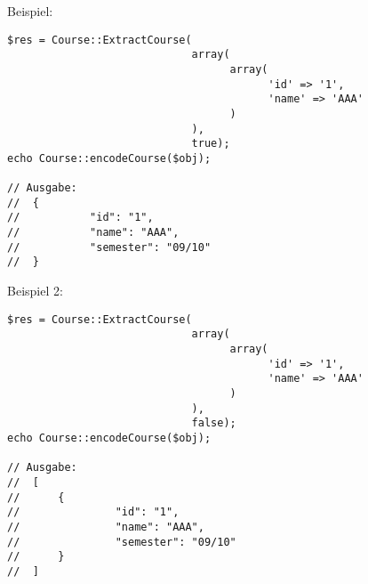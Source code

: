 \begin{minipage}{\textwidth}
Beispiel:
\begin{lstlisting}
$res = Course::ExtractCourse(
                             array(
                                   array(
                                         'id' => '1',
                                         'name' => 'AAA'
                                   )
                             ),
                             true);
echo Course::encodeCourse($obj);

// Ausgabe: 
//	{
//           "id": "1",
//           "name": "AAA",
//           "semester": "09/10"
//	}
\end{lstlisting}
\end{minipage}

\begin{minipage}{\textwidth}
Beispiel 2:
\begin{lstlisting}
$res = Course::ExtractCourse(
                             array(
                                   array(
                                         'id' => '1',
                                         'name' => 'AAA'
                                   )
                             ),
                             false);
echo Course::encodeCourse($obj);

// Ausgabe: 
//  [
//	    {
//               "id": "1",
//               "name": "AAA",
//               "semester": "09/10"
//	    }
//  ]
\end{lstlisting}
\end{minipage}